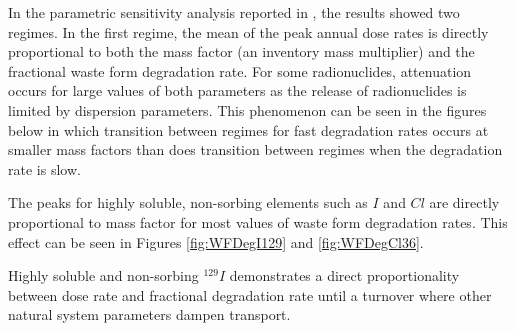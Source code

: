 In the parametric sensitivity analysis reported in \cite{huff_key_2012}, the
results showed two regimes. In the first regime, the mean of the peak annual
dose rates is directly proportional to both the mass factor (an inventory mass
multiplier) and the fractional waste form degradation rate. For some
radionuclides, attenuation occurs for large values of both parameters as the
release of radionuclides is limited by dispersion parameters. This phenomenon 
can be seen in the figures below in which transition between regimes for fast 
degradation rates occurs at smaller mass factors than does transition between 
regimes when the degradation rate is slow.

The peaks for highly soluble, non-sorbing elements such as $I$ and $Cl$
are directly proportional to mass factor for most
values of waste form degradation rates. This effect can be seen in Figures
\ref{fig:WFDegI129} and \ref{fig:WFDegCl36}.


Highly soluble and non-sorbing $^{129}I$ demonstrates a direct proportionality between dose rate and
fractional degradation rate until a turnover where other natural system
parameters dampen transport.

